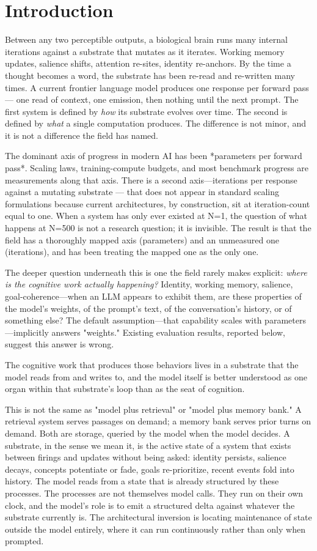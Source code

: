 \documentclass[11pt,letterpaper]{article}
\begin{document}
\section{Introduction}
Between any two perceptible outputs, a biological brain runs many
internal iterations against a substrate that mutates as it iterates.
Working memory updates, salience shifts, attention re-sites,
identity re-anchors. By the time a thought becomes a word, the
substrate has been re-read and re-written many times. A current
frontier language model produces one response per forward pass —
one read of context, one emission, then nothing until the next
prompt. The first system is defined by \emph{how} its substrate evolves
over time. The second is defined by \emph{what} a single computation
produces. The difference is not minor, and it is not a difference
the field has named.

The dominant axis of progress in modern AI has been *parameters per
forward pass*. Scaling laws, training-compute budgets, and most
benchmark progress are measurements along that axis. There is a
second axis---iterations per response against a mutating substrate
— that does not appear in standard scaling formulations because
current architectures, by construction, sit at iteration-count
equal to one. When a system has only ever existed at N=1, the
question of what happens at N=500 is not a research question; it
is invisible. The result is that the field has a thoroughly
mapped axis (parameters) and an unmeasured one (iterations), and
has been treating the mapped one as the only one.

The deeper question underneath this is one the field rarely makes
explicit: \emph{where is the cognitive work actually happening?}
Identity, working memory, salience, goal-coherence---when an LLM
appears to exhibit them, are these properties of the model's
weights, of the prompt's text, of the conversation's history, or
of something else? The default assumption---that capability scales
with parameters---implicitly answers "weights." Existing evaluation
results, reported below, suggest this answer is wrong.

The cognitive work that produces those behaviors lives in
a substrate that the model reads from and writes to, and the model
itself is better understood as one organ within that substrate's
loop than as the seat of cognition.

This is not the same as "model plus retrieval" or "model plus
memory bank." A retrieval system serves passages on demand; a
memory bank serves prior turns on demand. Both are storage, queried
by the model when the model decides. A substrate, in the sense we
mean it, is the active state of a system that exists between
firings and updates without being asked: identity persists, salience
decays, concepts potentiate or fade, goals re-prioritize, recent
events fold into history. The model reads from a state that is
already structured by these processes. The processes are not
themselves model calls. They run on their own clock, and the
model's role is to emit a structured delta against whatever the
substrate currently is. The architectural inversion is locating
maintenance of state outside the model entirely, where it can run
continuously rather than only when prompted.
\end{document}
